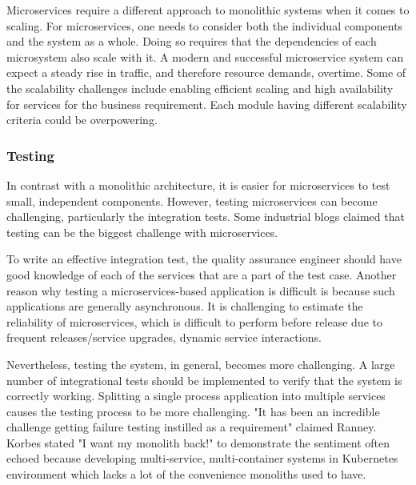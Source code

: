 Microservices require a different approach to monolithic systems when it comes to scaling. For microservices, one needs to consider both the individual components and the system as a whole. Doing so requires that the dependencies of each microsystem also scale with it.
A modern and successful microservice system can expect a steady rise in traffic, and therefore resource demands, overtime.\cite{Etsy, Soundcloud}
Some of the scalability challenges include enabling efficient scaling and high availability for services for the business requirement. Each module having different scalability criteria could be overpowering.\cite{khan2020}



\subsubsection{Testing}%

In contrast with a monolithic architecture, it is easier for microservices to test small, independent components. However, testing microservices can become challenging, particularly the integration tests.\cite{Dmitrii2019} Some industrial blogs claimed that testing can be the biggest challenge with microservices.\cite{Soundcloud, Karma}

To write an effective integration test, the quality assurance engineer should have good knowledge of each of the services that are a part of the test case. Another reason why testing a microservices-based application is difficult is because such applications are generally asynchronous. It is challenging to estimate the reliability of microservices, which is difficult to perform before release due to frequent releases/service upgrades, dynamic service interactions.\cite{Russo2020} 

Nevertheless, testing the system, in general, becomes more challenging. A large number of integrational tests should be implemented to verify that the system is correctly working.\cite{Zaytev2018} Splitting a single process application into multiple services causes the testing process to be more challenging.\cite{Huttunen2017}
"It has been an incredible challenge getting failure testing instilled as a requirement" claimed Ranney.\cite{Matt2016}
%
Korbes\cite{Ellen2018} stated "I want my monolith back!" to demonstrate the sentiment often echoed because developing multi-service, multi-container systems in Kubernetes environment which lacks a lot of the convenience monoliths used to have.



